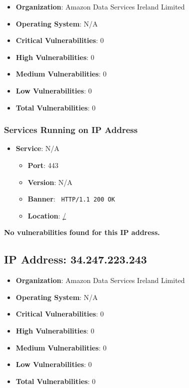 \documentclass{article}
\begin{document}
\begin{itemize}
    \item \textbf{Organization}: Amazon Data Services Ireland Limited
    \item \textbf{Operating System}:  N/A 
    \item \textbf{Critical Vulnerabilities}: 0
    \item \textbf{High Vulnerabilities}: 0
    \item \textbf{Medium Vulnerabilities}: 0
    \item \textbf{Low Vulnerabilities}: 0
    \item \textbf{Total Vulnerabilities}: 0
\end{itemize}

\subsubsection*{Services Running on IP Address}

\begin{itemize}
    
        \item \textbf{Service}: N/A
        \begin{itemize}
            \item \textbf{Port}: 443
            \item \textbf{Version}:  N/A 
            \item \textbf{Banner}: \texttt{ HTTP/1.1 200 OK
 }
            \item \textbf{Location}: \href{ / }{ / }
        \end{itemize}
    
\end{itemize}


\textbf{No vulnerabilities found for this IP address.}


\clearpage



\subsection*{IP Address: 34.247.223.243}

\begin{itemize}
    \item \textbf{Organization}: Amazon Data Services Ireland Limited
    \item \textbf{Operating System}:  N/A 
    \item \textbf{Critical Vulnerabilities}: 0
    \item \textbf{High Vulnerabilities}: 0
    \item \textbf{Medium Vulnerabilities}: 0
    \item \textbf{Low Vulnerabilities}: 0
    \item \textbf{Total Vulnerabilities}: 0
\end{itemize}
\end{document}
